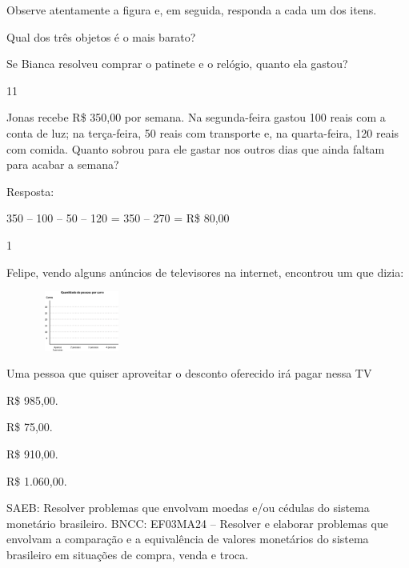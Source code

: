 \begin{multicols}{2}
{Observe atentamente a figura e, em seguida, responda a cada um dos itens.

\begin{escolha}

\item
  Qual dos três objetos é o mais barato?

\item
  Se Bianca resolveu comprar o patinete e o relógio, quanto ela gastou?

\num{11}

Jonas recebe R\$ 350,00 por semana. Na segunda-feira gastou 100 reais
com a conta de luz; na terça-feira, 50 reais com transporte e, na quarta-feira, 120 reais com comida. Quanto sobrou para ele gastar nos outros
dias que ainda faltam para acabar a semana?


Resposta:

350 -- 100 -- 50 -- 120 = 350 -- 270 = R\$ 80,00


\num{1}

Felipe, vendo alguns anúncios de televisores na internet, encontrou um que dizia:


\includegraphics[width=1.95850in,height=0.77507in]{media/image81.png}

Uma pessoa que quiser aproveitar o desconto oferecido irá pagar nessa TV

\begin{escolha}

\item
  R\$ 985,00.
\item
  R\$ 75,00.
\item
  R\$ 910,00.
\item
  R\$ 1.060,00.
\end{escolha}

SAEB: Resolver problemas que envolvam moedas e/ou cédulas do sistema monetário brasileiro. 
BNCC: EF03MA24 -- Resolver e elaborar problemas que envolvam a comparação e a equivalência de
valores monetários do sistema brasileiro em situações de compra, venda e troca.


\end{escolha}}
\end{multicols}
